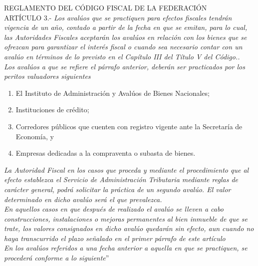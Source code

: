 \textcolor{principal}{REGLAMENTO DEL C\'ODIGO FISCAL DE LA FEDERACI\'ON}\\


\textcolor{secundario}{ART\'ICULO 3.-} \textit{Los aval\'uos que se practiquen para efectos fiscales tendr\'an vigencia de un a\~no, contado a partir de la fecha en que se emitan, para lo cual, las Autoridades Fiscales aceptar\'an los aval\'uos en relaci\'on con los bienes que se ofrezcan para garantizar el inter\'es fiscal o cuando sea necesario contar con un aval\'uo en t\'erminos de lo previsto en el Cap\'itulo III del Título V del C\'odigo..} \\

\textit{Los aval\'uos a que se refiere el p\'arrafo anterior, deber\'an ser practicados por los peritos valuadores siguientes}

\begin{enumerate}[\indent I.]

\item El Instituto de Administraci\'on y Aval\'uos de Bienes Nacionales; 
\item Instituciones de cr\'edito; 
\item Corredores p\'ublicos que cuenten con registro vigente ante la Secretar\'ia de Econom\'ia, y 
\item Empresas dedicadas a la compraventa o subasta de bienes. 
\end{enumerate}

\textit{La Autoridad Fiscal en los casos que proceda y mediante el procedimiento que al efecto establezca el Servicio de Administraci\'on Tributaria mediante reglas de car\'acter general, podr\'a solicitar la pr\'actica de un segundo aval\'uo. El valor determinado en dicho aval\'uo ser\'a el que prevalezca. } \\

\textit{En aquellos casos en que despu\'es de realizado el aval\'uo se lleven a cabo construcciones, instalaciones o mejoras permanentes al bien inmueble de que se trate, los valores consignados en dicho aval\'uo quedar\'an sin efecto, aun cuando no haya transcurrido el plazo se\~nalado en el primer p\'arrafo de este art\'iculo} \\

\textit{En los aval\'uos referidos a una fecha anterior a aquella en que se practiquen, se proceder\'a conforme a lo siguiente}''\\


